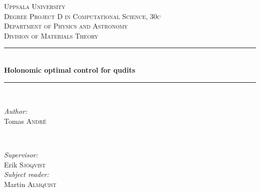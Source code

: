 \documentclass[a4paper, 12pt]{article}
\newcommand{\HRule}{\rule{\linewidth}{0.5mm}} %
\begin{document}
\begin{titlepage}


\center %
 
 
 
 

\textsc{\LARGE Uppsala University}\\[1.5cm] %
\textsc{\Large Degree Project D in Computational Science, 30c}\\[0.5cm] %
\textsc{\large Department of Physics and Astronomy\\ Division of Materials Theory}\\[0.5cm] %


\HRule \\[0.4cm]
{ \huge \bfseries Holonomic optimal control for qudits}\\[0.4cm] %
\HRule \\[1.5cm]
 

\begin{minipage}{0.4\textwidth}
\begin{flushleft} \large
\emph{Author:}\\
Tomas \textsc{André} %
\end{flushleft}
\end{minipage}
~
\begin{minipage}{0.4\textwidth}
\begin{flushright} \large
\emph{Supervisor:} \\
Erik \textsc{Sjöqvist} \\
\emph{Subject reader:} \\
Martin \textsc{Almquist} %
\end{flushright}
\end{minipage}\\[2cm]


\end{titlepage}
\end{document}
